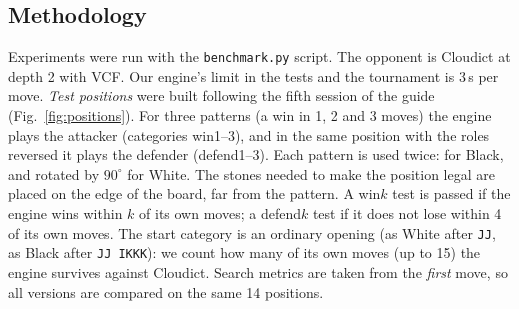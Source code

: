 \documentclass[a4paper,10pt,twocolumn]{article}
\newcommand{\code}[1]{\texttt{#1}}
\begin{document}
\subsection{Methodology}
Experiments were run with the \code{benchmark.py} script. The opponent is Cloudict at depth 2 with VCF. Our engine's limit in the tests and the tournament is 3\,s per move. \emph{Test positions} were built following the fifth session of the guide (Fig.~\ref{fig:positions}). For three patterns (a win in 1, 2 and 3 moves) the engine plays the attacker (categories win1--3), and in the same position with the roles reversed it plays the defender (defend1--3). Each pattern is used twice: for Black, and rotated by $90^\circ$ for White. The stones needed to make the position legal are placed on the edge of the board, far from the pattern. A win$k$ test is passed if the engine wins within $k$ of its own moves; a defend$k$ test if it does not lose within 4 of its own moves. The start category is an ordinary opening (as White after \code{JJ}, as Black after \code{JJ IKKK}): we count how many of its own moves (up to 15) the engine survives against Cloudict. Search metrics are taken from the \emph{first} move, so all versions are compared on the same 14 positions.
\end{document}
